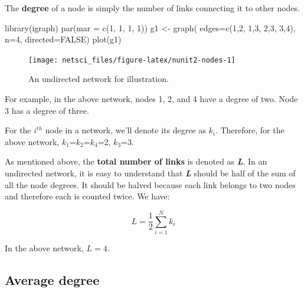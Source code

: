 \documentclass[
]{krantz}
\makeatletter
\newenvironment{Shaded}{\begin{snugshade}}{\end{snugshade}}
\newcommand{\AttributeTok}[1]{\textcolor[rgb]{0.61,0.61,0.61}{#1}}
\newcommand{\ConstantTok}[1]{\textcolor[rgb]{0,0,0}{#1}}
\newcommand{\DecValTok}[1]{\textcolor[rgb]{0.06,0.06,0.06}{#1}}
\newcommand{\FunctionTok}[1]{\textcolor[rgb]{0,0,0}{#1}}
\newcommand{\NormalTok}[1]{#1}
\newcommand{\OtherTok}[1]{\textcolor[rgb]{0.37,0.37,0.37}{#1}}
\newenvironment{kframe}{%
\medskip{}
\setlength{\fboxsep}{.8em}
 \def\at@end@of@kframe{}%
 \ifinner\ifhmode%
  \def\at@end@of@kframe{\end{minipage}}%
  \begin{minipage}{\columnwidth}%
 \fi\fi%
 \def\FrameCommand##1{\hskip\@totalleftmargin \hskip-\fboxsep
 \colorbox{shadecolor}{##1}\hskip-\fboxsep
     \hskip-\linewidth \hskip-\@totalleftmargin \hskip\columnwidth}%
 \MakeFramed {\advance\hsize-\width
   \@totalleftmargin\z@ \linewidth\hsize
   \@setminipage}}%
 {\par\unskip\endMakeFramed%
 \at@end@of@kframe}
\renewenvironment{Shaded}{\begin{kframe}}{\end{kframe}}
\makeatother
\begin{document}
The \textbf{degree} of a node is simply the number of links connecting it to other nodes.

\begin{Shaded}
\begin{Highlighting}[]
\FunctionTok{library}\NormalTok{(igraph)}
\FunctionTok{par}\NormalTok{(}\AttributeTok{mar =} \FunctionTok{c}\NormalTok{(}\DecValTok{1}\NormalTok{, }\DecValTok{1}\NormalTok{, }\DecValTok{1}\NormalTok{, }\DecValTok{1}\NormalTok{))}
\NormalTok{g1 }\OtherTok{\textless{}{-}} \FunctionTok{graph}\NormalTok{( }\AttributeTok{edges=}\FunctionTok{c}\NormalTok{(}\DecValTok{1}\NormalTok{,}\DecValTok{2}\NormalTok{, }\DecValTok{1}\NormalTok{,}\DecValTok{3}\NormalTok{, }\DecValTok{2}\NormalTok{,}\DecValTok{3}\NormalTok{, }\DecValTok{3}\NormalTok{,}\DecValTok{4}\NormalTok{), }\AttributeTok{n=}\DecValTok{4}\NormalTok{, }\AttributeTok{directed=}\ConstantTok{FALSE}\NormalTok{)}
\FunctionTok{plot}\NormalTok{(g1)}
\end{Highlighting}
\end{Shaded}

\begin{figure}

{\centering \texttt{[image: netsci\_files/figure-latex/nunit2-nodes-1]} 

}

\caption{An undirected network for illustration.}\label{fig:nunit2-nodes}
\end{figure}

For example, in the above network, nodes 1, 2, and 4 have a degree of two. Node 3 has a degree of three.

For the \(i^{th}\) node in a network, we'll denote its degree as \(k_i\). Therefore, for the above network, \(k_1\)=\(k_2\)=\(k_4\)=2, \(k_3\)=3.

As mentioned above, the \textbf{total number of links} is denoted as \textbf{\emph{L}}. In an undirected network, it is easy to understand that \textbf{\emph{L}} should be half of the sum of all the node degrees. It should be halved because each link belongs to two nodes and therefore each is counted twice. We have:

\begin{equation} 
  L = \frac{1}{2} \sum_{i=1}^N k_i \label{eq:TotalLink}
\end{equation}

In the above network, \(L = 4\).

\hypertarget{average-degree}{%
\subsection{Average degree}\label{average-degree}}
\end{document}
